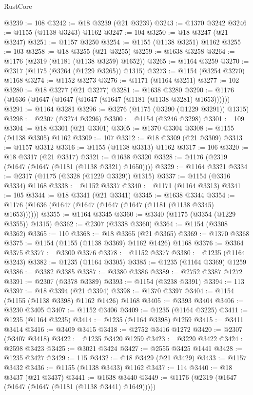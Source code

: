 \begin{lexlean}{RustCore}
\begin{coremodule}
@3239 := 108
@3242 := @18 @3239 (@21 @3239)
@3243 := @1370 @3242
@3246 := @1155 (@1138 @3243) @1162
@3247 := 104
@3250 := @18 @3247 (@21 @3247)
@3251 := @1157 @3250
@3254 := @1155 (@1138 @3251) @1162
@3255 := 103
@3258 := @18 @3255 (@21 @3255)
@3259 := @1638 @3258
@3264 := @1176 (@2319 (@1181 (@1138 @3259) @1652))
@3265 := @1164 @3259
@3270 := @2317 (@1175 (@3264 (@1229 @3265)) @1315)
@3273 := @1154 (@3254 @3270) @1168
@3274 := @1152 @3273
@3276 := @1171 (@1164 @3251)
@3277 := 102
@3280 := @18 @3277 (@21 @3277)
@3281 := @1638 @3280
@3290 := @1176 (@1636 (@1647 (@1647 (@1647 (@1647 (@1181 (@1138 @3281) @1653))))))
@3291 := @1164 @3281
@3296 := @3276 (@1175 (@3290 (@1229 @3291)) @1315)
@3298 := @2307 (@3274 @3296)
@3300 := @1154 (@3246 @3298)
@3301 := 109
@3304 := @18 @3301 (@21 @3301)
@3305 := @1370 @3304
@3308 := @1155 (@1138 @3305) @1162
@3309 := 107
@3312 := @18 @3309 (@21 @3309)
@3313 := @1157 @3312
@3316 := @1155 (@1138 @3313) @1162
@3317 := 106
@3320 := @18 @3317 (@21 @3317)
@3321 := @1638 @3320
@3328 := @1176 (@2319 (@1647 (@1647 (@1181 (@1138 @3321) @1650))))
@3329 := @1164 @3321
@3334 := @2317 (@1175 (@3328 (@1229 @3329)) @1315)
@3337 := @1154 (@3316 @3334) @1168
@3338 := @1152 @3337
@3340 := @1171 (@1164 @3313)
@3341 := 105
@3344 := @18 @3341 (@21 @3341)
@3345 := @1638 @3344
@3354 := @1176 (@1636 (@1647 (@1647 (@1647 (@1647 (@1181 (@1138 @3345) @1653))))))
@3355 := @1164 @3345
@3360 := @3340 (@1175 (@3354 (@1229 @3355)) @1315)
@3362 := @2307 (@3338 @3360)
@3364 := @1154 (@3308 @3362)
@3365 := 110
@3368 := @18 @3365 (@21 @3365)
@3369 := @1370 @3368
@3375 := @1154 (@1155 (@1138 @3369) @1162 @1426) @1168
@3376 := @3364 @3375
@3377 := @3300 @3376
@3378 := @1152 @3377
@3380 := @1235 (@1164 @3243)
@3382 := @1235 (@1164 @3305)
@3385 := @1235 (@1164 @3369) @1259
@3386 := @3382 @3385
@3387 := @3380 @3386
@3389 := @2752 @3387 @1272
@3391 := @2307 (@3378 @3389)
@3393 := @1154 (@3238 @3391)
@3394 := 113
@3397 := @18 @3394 (@21 @3394)
@3398 := @1370 @3397
@3404 := @1154 (@1155 (@1138 @3398) @1162 @1426) @1168
@3405 := @3393 @3404
@3406 := @3230 @3405
@3407 := @1152 @3406
@3409 := @1235 (@1164 @3225)
@3411 := @1235 (@1164 @3235)
@3414 := @1235 (@1164 @3398) @1259
@3415 := @3411 @3414
@3416 := @3409 @3415
@3418 := @2752 @3416 @1272
@3420 := @2307 (@3407 @3418)
@3422 := @1235 @3420 @1259
@3423 := @3220 @3422
@3424 := @2598 @3423
@3425 := @3021 @3424
@3427 := @2555 @3425 @1441
@3428 := @1235 @3427
@3429 := 115
@3432 := @18 @3429 (@21 @3429)
@3433 := @1157 @3432
@3436 := @1155 (@1138 @3433) @1162
@3437 := 114
@3440 := @18 @3437 (@21 @3437)
@3441 := @1638 @3440
@3449 := @1176 (@2319 (@1647 (@1647 (@1647 (@1181 (@1138 @3441) @1649)))))

\end{coremodule}
\end{lexlean}
